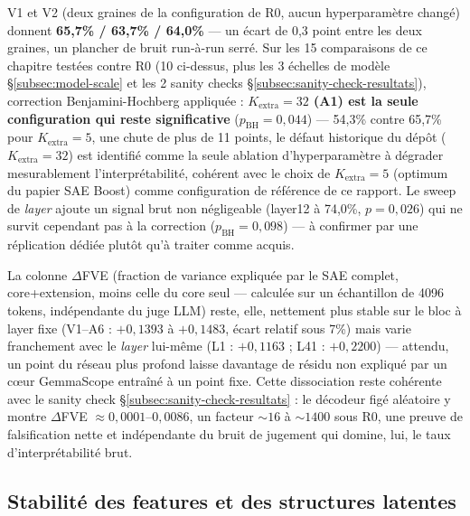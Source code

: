 \documentclass[11pt]{article}
\begin{document}
\begin{resultbox}
V1 et V2 (deux graines de la configuration de R0, aucun hyperparamètre
changé) donnent \textbf{65,7\% / 63,7\% / 64,0\%} --- un écart de 0,3 point
entre les deux graines, un plancher de bruit run-à-run serré. Sur les 15 comparaisons de ce chapitre testées contre R0
(10 ci-dessus, plus les 3 échelles de modèle \S\ref{subsec:model-scale} et
les 2 sanity checks \S\ref{subsec:sanity-check-resultats}), correction
Benjamini-Hochberg appliquée : \textbf{$K_\text{extra}=32$ (A1) est la seule
configuration qui reste significative} ($p_\text{BH}=0{,}044$) --- 54,3\%
contre 65,7\% pour $K_\text{extra}=5$, une chute de plus de 11 points, le défaut historique du
dépôt ($K_\text{extra}=32$) est identifié comme la seule ablation
d'hyperparamètre à dégrader mesurablement l'interprétabilité, cohérent avec
le choix de $K_\text{extra}=5$ (optimum du papier SAE Boost) comme
configuration de référence de ce rapport. Le sweep de \emph{layer} ajoute un
signal brut non négligeable (layer12 à 74,0\%, $p=0{,}026$) qui ne survit
cependant pas à la correction ($p_\text{BH}=0{,}098$) --- à confirmer par une
réplication dédiée plutôt qu'à traiter comme acquis.

La colonne $\Delta$FVE (fraction de variance expliquée par le SAE complet,
core+extension, moins celle du core seul --- calculée sur un échantillon de
4096 tokens, indépendante du juge LLM) reste, elle, nettement plus stable sur
le bloc à layer fixe (V1--A6 : $+0{,}1393$ à $+0{,}1483$, écart relatif sous
7\%) mais varie franchement avec le \emph{layer} lui-même (L1 : $+0{,}1163$ ;
L41 : $+0{,}2200$) --- attendu, un point du réseau plus profond laisse
davantage de résidu non expliqué par un cœur GemmaScope entraîné à un point
fixe. Cette dissociation reste cohérente avec le sanity check
\S\ref{subsec:sanity-check-resultats} : le décodeur figé aléatoire y montre
$\Delta$FVE $\approx 0{,}0001$--$0{,}0086$, un facteur ${\sim}16$ à
${\sim}1400$ sous R0, une preuve de falsification nette et indépendante du
bruit de jugement qui domine, lui, le taux d'interprétabilité brut.
\end{resultbox}

\subsection{Stabilité des features et des structures latentes}
\label{subsec:reproductibilite}
\end{document}
